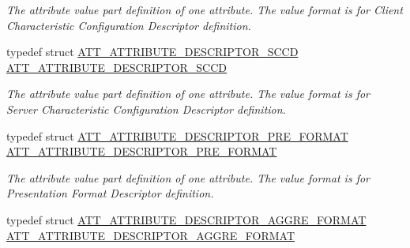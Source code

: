 \begin{DoxyCompactItemize}
\begin{DoxyCompactList}\small\item\em The attribute value part definition of one attribute. The value format is for Client Characteristic Configuration Descriptor definition. \end{DoxyCompactList}\item 
typedef struct \hyperlink{struct_a_t_t___a_t_t_r_i_b_u_t_e___d_e_s_c_r_i_p_t_o_r___s_c_c_d}{A\+T\+T\+\_\+\+A\+T\+T\+R\+I\+B\+U\+T\+E\+\_\+\+D\+E\+S\+C\+R\+I\+P\+T\+O\+R\+\_\+\+S\+C\+CD} \hyperlink{group___b_l_e___g_a_t_t___s_e_r_v_i_c_e___t_a_b_l_e_ga793f073da7db4195490c2c93f226294f}{A\+T\+T\+\_\+\+A\+T\+T\+R\+I\+B\+U\+T\+E\+\_\+\+D\+E\+S\+C\+R\+I\+P\+T\+O\+R\+\_\+\+S\+C\+CD}\hypertarget{group___b_l_e___g_a_t_t___s_e_r_v_i_c_e___t_a_b_l_e_ga793f073da7db4195490c2c93f226294f}{}\label{group___b_l_e___g_a_t_t___s_e_r_v_i_c_e___t_a_b_l_e_ga793f073da7db4195490c2c93f226294f}

\begin{DoxyCompactList}\small\item\em The attribute value part definition of one attribute. The value format is for Server Characteristic Configuration Descriptor definition. \end{DoxyCompactList}\item 
typedef struct \hyperlink{struct_a_t_t___a_t_t_r_i_b_u_t_e___d_e_s_c_r_i_p_t_o_r___p_r_e___f_o_r_m_a_t}{A\+T\+T\+\_\+\+A\+T\+T\+R\+I\+B\+U\+T\+E\+\_\+\+D\+E\+S\+C\+R\+I\+P\+T\+O\+R\+\_\+\+P\+R\+E\+\_\+\+F\+O\+R\+M\+AT} \hyperlink{group___b_l_e___g_a_t_t___s_e_r_v_i_c_e___t_a_b_l_e_ga88d56229fd50f23f4ec1f384c2d714ad}{A\+T\+T\+\_\+\+A\+T\+T\+R\+I\+B\+U\+T\+E\+\_\+\+D\+E\+S\+C\+R\+I\+P\+T\+O\+R\+\_\+\+P\+R\+E\+\_\+\+F\+O\+R\+M\+AT}\hypertarget{group___b_l_e___g_a_t_t___s_e_r_v_i_c_e___t_a_b_l_e_ga88d56229fd50f23f4ec1f384c2d714ad}{}\label{group___b_l_e___g_a_t_t___s_e_r_v_i_c_e___t_a_b_l_e_ga88d56229fd50f23f4ec1f384c2d714ad}

\begin{DoxyCompactList}\small\item\em The attribute value part definition of one attribute. The value format is for Presentation Format Descriptor definition. \end{DoxyCompactList}\item 
typedef struct \hyperlink{struct_a_t_t___a_t_t_r_i_b_u_t_e___d_e_s_c_r_i_p_t_o_r___a_g_g_r_e___f_o_r_m_a_t}{A\+T\+T\+\_\+\+A\+T\+T\+R\+I\+B\+U\+T\+E\+\_\+\+D\+E\+S\+C\+R\+I\+P\+T\+O\+R\+\_\+\+A\+G\+G\+R\+E\+\_\+\+F\+O\+R\+M\+AT} \hyperlink{group___b_l_e___g_a_t_t___s_e_r_v_i_c_e___t_a_b_l_e_gac7e43537079f78bbe8bb67dc3ea23efe}{A\+T\+T\+\_\+\+A\+T\+T\+R\+I\+B\+U\+T\+E\+\_\+\+D\+E\+S\+C\+R\+I\+P\+T\+O\+R\+\_\+\+A\+G\+G\+R\+E\+\_\+\+F\+O\+R\+M\+AT}\hypertarget{group___b_l_e___g_a_t_t___s_e_r_v_i_c_e___t_a_b_l_e_gac7e43537079f78bbe8bb67dc3ea23efe}{}\label{group___b_l_e___g_a_t_t___s_e_r_v_i_c_e___t_a_b_l_e_gac7e43537079f78bbe8bb67dc3ea23efe}


\end{DoxyCompactItemize}
